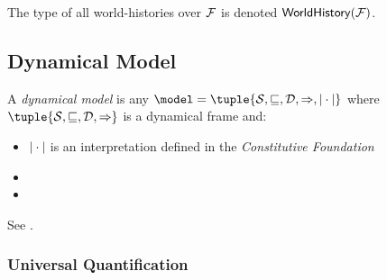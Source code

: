 \documentclass[../LogosReference.tex]{subfiles}
\begin{document}
\begin{notation}
The type of all world-histories over $\mathcal{F}$ is denoted $\mathsf{WorldHistory}(\mathcal{F})$.
\end{notation}


\subsection{Dynamical Model}\label{sec:core-model}



\begin{definition}\label{def:core-model}
  A \emph{dynamical model} is any $\model = \tuple{\statespace, \parthood, \temporalorder, \taskrel, \interp{\cdot}}$ where $\tuple{\statespace, \parthood, \temporalorder, \taskrel}$ is a dynamical frame and:
  \begin{itemize}
    \item $|\cdot|$ is an interpretation defined in the \textit{Constitutive Foundation}
    \item %
    \item %
  \end{itemize}
  
\end{definition}

\noindent
See .


\subsubsection{Universal Quantification}\label{sec:universal-quantification}
\end{document}
